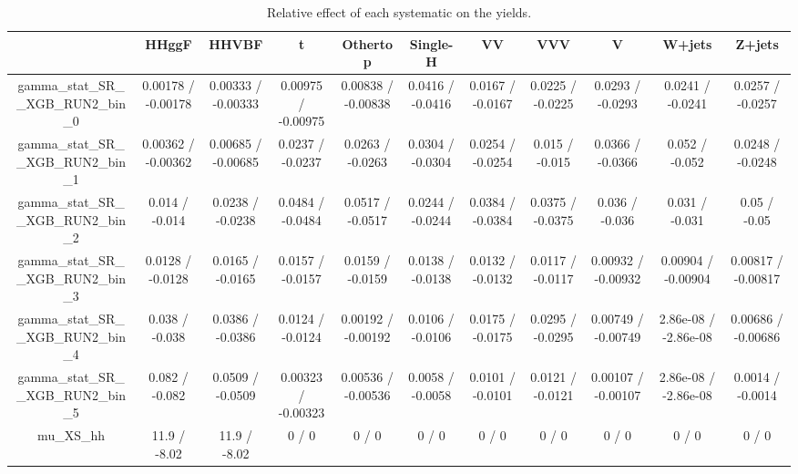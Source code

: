 \documentclass[10pt]{article}
\begin{document}
\begin{table}[htbp]
\begin{center}
\begin{tabular}{|c|c|c|c|c|c|c|c|c|c|c|}
\hline 
      & HHggF      & HHVBF      & t      & Othertop      & Single-H      & VV      & VVV      & V      & W+jets      & Z+jets \\ 
\hline 
  gamma_stat_SR__XGB_RUN2_bin_0 & 0.00178 / -0.00178 & 0.00333 / -0.00333 & 0.00975 / -0.00975 & 0.00838 / -0.00838 & 0.0416 / -0.0416 & 0.0167 / -0.0167 & 0.0225 / -0.0225 & 0.0293 / -0.0293 & 0.0241 / -0.0241 & 0.0257 / -0.0257 \\ 
  gamma_stat_SR__XGB_RUN2_bin_1 & 0.00362 / -0.00362 & 0.00685 / -0.00685 & 0.0237 / -0.0237 & 0.0263 / -0.0263 & 0.0304 / -0.0304 & 0.0254 / -0.0254 & 0.015 / -0.015 & 0.0366 / -0.0366 & 0.052 / -0.052 & 0.0248 / -0.0248 \\ 
  gamma_stat_SR__XGB_RUN2_bin_2 & 0.014 / -0.014 & 0.0238 / -0.0238 & 0.0484 / -0.0484 & 0.0517 / -0.0517 & 0.0244 / -0.0244 & 0.0384 / -0.0384 & 0.0375 / -0.0375 & 0.036 / -0.036 & 0.031 / -0.031 & 0.05 / -0.05 \\ 
  gamma_stat_SR__XGB_RUN2_bin_3 & 0.0128 / -0.0128 & 0.0165 / -0.0165 & 0.0157 / -0.0157 & 0.0159 / -0.0159 & 0.0138 / -0.0138 & 0.0132 / -0.0132 & 0.0117 / -0.0117 & 0.00932 / -0.00932 & 0.00904 / -0.00904 & 0.00817 / -0.00817 \\ 
  gamma_stat_SR__XGB_RUN2_bin_4 & 0.038 / -0.038 & 0.0386 / -0.0386 & 0.0124 / -0.0124 & 0.00192 / -0.00192 & 0.0106 / -0.0106 & 0.0175 / -0.0175 & 0.0295 / -0.0295 & 0.00749 / -0.00749 & 2.86e-08 / -2.86e-08 & 0.00686 / -0.00686 \\ 
  gamma_stat_SR__XGB_RUN2_bin_5 & 0.082 / -0.082 & 0.0509 / -0.0509 & 0.00323 / -0.00323 & 0.00536 / -0.00536 & 0.0058 / -0.0058 & 0.0101 / -0.0101 & 0.0121 / -0.0121 & 0.00107 / -0.00107 & 2.86e-08 / -2.86e-08 & 0.0014 / -0.0014 \\ 
  mu_XS_hh & 11.9 / -8.02 & 11.9 / -8.02 & 0 / 0 & 0 / 0 & 0 / 0 & 0 / 0 & 0 / 0 & 0 / 0 & 0 / 0 & 0 / 0 \\ 
\hline 
\end{tabular} 
\caption{Relative effect of each systematic on the yields.} 
\end{center} 
\end{table} 
\end{document}

